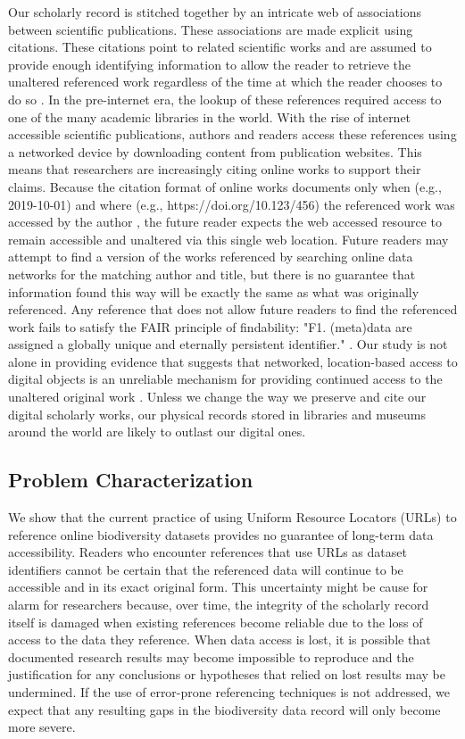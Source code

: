 Our scholarly record is stitched together by an intricate web of associations between scientific publications. These associations are made explicit using citations. These citations point to related scientific works and are assumed to provide enough identifying information to allow the reader to retrieve the unaltered referenced work regardless of the time at which the reader chooses to do so \citep{Garfield_1964}. In the pre-internet era, the lookup of these references required access to one of the many academic libraries in the world. With the rise of internet accessible scientific publications, authors and readers access these references using a networked device by downloading content from publication websites. This means that researchers are increasingly citing online works to support their claims. Because the citation format of online works documents only when (e.g., 2019-10-01) and where (e.g., https://doi.org/10.123/456) the referenced work was accessed by the author \citep{gbif_2019,idigbio_2016,dataone_2012}, the future reader expects the web accessed resource to remain accessible and unaltered via this single web location. Future readers may attempt to find a version of the works referenced by searching online data networks for the matching author and title, but there is no guarantee that information found this way will be exactly the same as what was originally referenced. Any reference that does not allow future readers to find the referenced work fails to satisfy the FAIR principle of findability: "F1. (meta)data are assigned a globally unique and eternally persistent identifier." \citep{Wilkinson_2016}. Our study is not alone in providing evidence that suggests that networked, location-based access to digital objects is an unreliable mechanism for providing continued access to the unaltered original work \citep{Vision_2010,Klein_2014}. Unless we change the way we preserve and cite our digital scholarly works, our physical records stored in libraries and museums around the world are likely to outlast our digital ones.

\subsection*{Problem Characterization}
We show that the current practice of using Uniform Resource Locators (URLs) \citep{rfc1738} to reference online biodiversity datasets provides no guarantee of long-term data accessibility.  Readers who encounter references that use URLs as dataset identifiers cannot be certain that the referenced data will continue to be accessible and in its exact original form. This uncertainty might be cause for alarm for researchers because, over time, the integrity of the scholarly record itself is damaged when existing references become reliable due to the loss of access to the data they reference. When data access is lost, it is possible that documented research results may become impossible to reproduce and the justification for any conclusions or hypotheses that relied on lost results may be undermined. If the use of error-prone referencing techniques is not addressed, we expect that any resulting gaps in the biodiversity data record will only become more severe.

